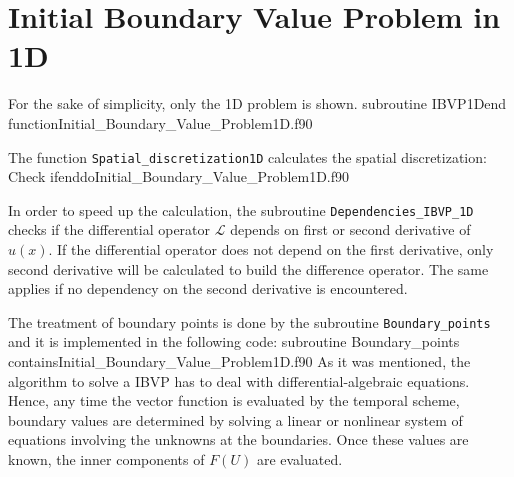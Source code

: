 \section{Initial Boundary Value Problem in 1D}
       
      
For the sake of simplicity,  only the 1D problem is shown.
        {subroutine IBVP1D}{end function}{Initial_Boundary_Value_Problem1D.f90} 
        
   
   \vspace{-0.5cm}
The function   \verb|Spatial_discretization1D|  calculates the spatial discretization: 
         {Check if}{enddo}{Initial_Boundary_Value_Problem1D.f90}      
        
\newpage  
 In order to speed up the calculation, the subroutine \verb|Dependencies_IBVP_1D| checks if the differential operator
 $ \mathcal{L} $ depends on 
 first or second derivative of $ u(x) $. If the differential operator does not depend on the first derivative, only second derivative  will be calculated to build the difference operator. The same applies if no dependency on the second derivative is encountered. 
 
 
 
 The treatment of boundary points  is done by the subroutine \verb|Boundary_points| 
 and it is implemented in the following code: 
         \vspace{0.1cm} 
                 {subroutine Boundary_points}
                 {contains}{Initial_Boundary_Value_Problem1D.f90}
 As it was mentioned, the algorithm to solve a IBVP has to deal with differential-algebraic equations. Hence, any time the vector function is evaluated by the temporal scheme, boundary values are determined by solving a linear or nonlinear system of equations involving the unknowns at the boundaries. Once these values are known, the inner components of $ F (U) $ are evaluated. 
 
 
 